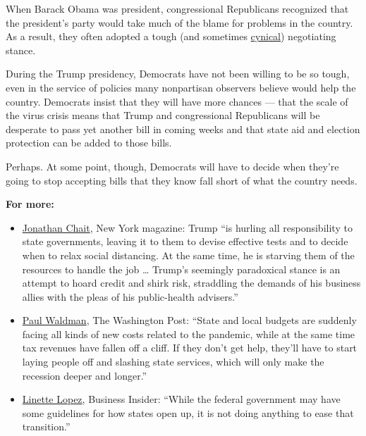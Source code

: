 When Barack Obama was president, congressional Republicans recognized
that the president's party would take much of the blame for problems in
the country. As a result, they often adopted a tough (and sometimes
\href{https://www.simonandschuster.com/books/The-Cynic/Alec-MacGillis/9781501112034}{cynical})
negotiating stance.

During the Trump presidency, Democrats have not been willing to be so
tough, even in the service of policies many nonpartisan observers
believe would help the country. Democrats insist that they will have
more chances --- that the scale of the virus crisis means that Trump and
congressional Republicans will be desperate to pass yet another bill in
coming weeks and that state aid and election protection can be added to
those bills.

Perhaps. At some point, though, Democrats will have to decide when
they're going to stop accepting bills that they know fall short of what
the country needs.

\textbf{For more:}

\begin{itemize}
\item
  \href{https://nymag.com/intelligencer/2020/04/trump-coronavirus-open-state-governors-protests.html}{Jonathan
  Chait}, New York magazine: Trump ``is hurling all responsibility to
  state governments, leaving it to them to devise effective tests and to
  decide when to relax social distancing. At the same time, he is
  starving them of the resources to handle the job \ldots{} Trump's
  seemingly paradoxical stance is an attempt to hoard credit and shirk
  risk, straddling the demands of his business allies with the pleas of
  his public-health advisers.''
\item
  \href{https://www.washingtonpost.com/opinions/2020/04/20/war-against-states/}{Paul
  Waldman}, The Washington Post: ``State and local budgets are suddenly
  facing all kinds of new costs related to the pandemic, while at the
  same time tax revenues have fallen off a cliff. If they don't get
  help, they'll have to start laying people off and slashing state
  services, which will only make the recession deeper and longer.''
\item
  \href{https://www.businessinsider.com/trump-treatment-state-governors-governments-coronavirus-response-getting-worse-2020-4}{Linette
  Lopez}, Business Insider: ``While the federal government may have some
  guidelines for how states open up, it is not doing anything to ease
  that transition.''
\end{itemize}

